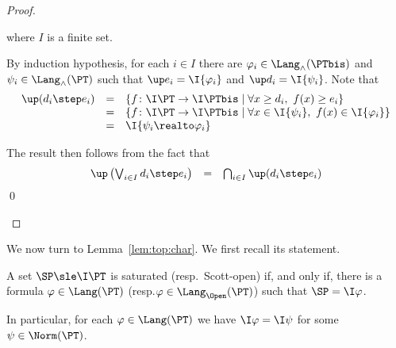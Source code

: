 \begin{proof}
\begin{description}
\noindent
where $I$ is a finite set.

By induction hypothesis, for each $i \in I$
there are $\varphi_i \in \Lang_\land(\PTbis)$
and $\psi_i \in \Lang_\land(\PT)$
such that $\up e_i = \I{\varphi_i}$
and $\up d_i = \I{\psi_i}$.
Note that
\[
\begin{array}{l l l}
  \up(d_i \step e_i)
& =
& \left\{
  f \colon \I\PT \to \I\PTbis \mid
  \forall x \geq d_i,~
  f(x) \geq e_i
  \right\}
\\

& =
& \left\{
  f \colon \I\PT \to \I\PTbis \mid
  \forall x \in \I{\psi_i},~
  f(x) \in \I{\varphi_i}
  \right\}
\\

& =
& \I{\psi_i \realto \varphi_i}
\end{array}
\]

\noindent
The result then follows from the fact that
\[
\begin{array}{l l l}
  \up \left(
  \bigvee_{i \in I} d_i \step e_i
  \right)
& =
& \bigcap_{i \in I} \up(d_i \step e_i)
\end{array}
\]
\qed
\end{description}
\end{proof}


We now turn to Lemma~\ref{lem:top:char}.
We first recall its statement.


\begin{lemma}
\label{lem:proof:top:char}
A set $\SP \sle \I\PT$ is saturated (resp.\ Scott-open)
if, and only if, there is a formula $\varphi \in \Lang(\PT)$
(resp.\@ $\varphi \in \Lang_\Open(\PT)$)
such that $\SP = \I\varphi$.

In particular, for each $\varphi \in \Lang(\PT)$
we have $\I\varphi = \I\psi$ for some $\psi \in \Norm(\PT)$.
\end{lemma}

